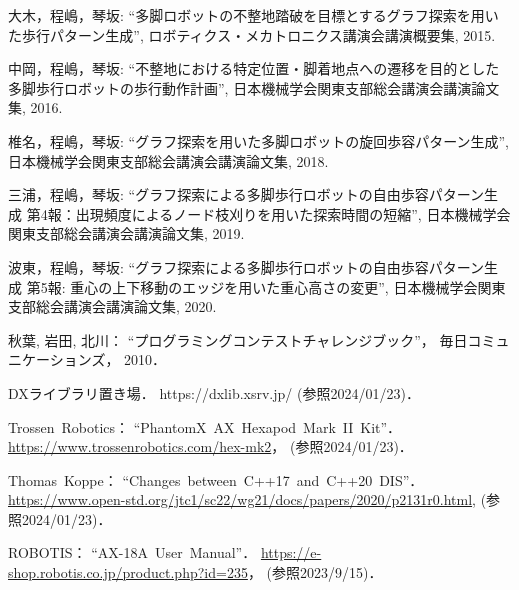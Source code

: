 \begin{thebibliography}{99}
    大木，程嶋，琴坂: 
    ``多脚ロボットの不整地踏破を目標とするグラフ探索を用いた歩行パターン生成'', 
    ロボティクス・メカトロニクス講演会講演概要集,
    2015.   

    中岡，程嶋，琴坂: 
    ``不整地における特定位置・脚着地点への遷移を目的とした多脚歩行ロボットの歩行動作計画'',
    日本機械学会関東支部総会講演会講演論文集,
    2016.

    椎名，程嶋，琴坂: 
    ``グラフ探索を用いた多脚ロボットの旋回歩容パターン生成'',
    日本機械学会関東支部総会講演会講演論文集,
    2018.

    三浦，程嶋，琴坂: 
    ``グラフ探索による多脚歩行ロボットの自由歩容パターン生成 第4報：出現頻度によるノード枝刈りを用いた探索時間の短縮'',
    日本機械学会関東支部総会講演会講演論文集,
    2019.

    波東，程嶋，琴坂: 
    ``グラフ探索による多脚歩行ロボットの自由歩容パターン生成 第5報: 重心の上下移動のエッジを用いた重心高さの変更'',
    日本機械学会関東支部総会講演会講演論文集,
    2020.

    秋葉, 岩田, 北川：
    ``プログラミングコンテストチャレンジブック''，
    毎日コミュニケーションズ，
    2010．
    
    DXライブラリ置き場．
    https://dxlib.xsrv.jp/ (参照2024/01/23)．

    Trossen~Robotics：
    ``PhantomX~AX~Hexapod~Mark~II~Kit''．
    \url{https://www.trossenrobotics.com/hex-mk2}，
    (参照2024/01/23)．

    Thomas~Koppe：
    ``Changes~between~C++17~and~C++20~DIS''．
    \url{https://www.open-std.org/jtc1/sc22/wg21/docs/papers/2020/p2131r0.html}, 
    (参照2024/01/23)．

    ROBOTIS：
    ``AX-18A~User~Manual''．
    \url{https://e-shop.robotis.co.jp/product.php?id=235}，
    (参照2023/9/15)．

\end{thebibliography}
\endinput